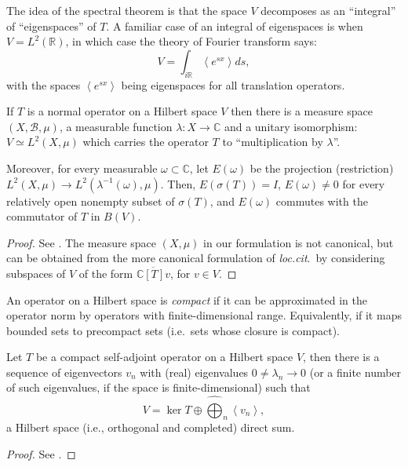 The idea of the spectral theorem is that the space $V$ decomposes as an ``integral'' of ``eigenspaces'' of $T$. A familiar case of an integral of eigenspaces is when $V=L^2(\mathbb R)$, in which case the theory of Fourier transform says:
$$V= \int_{i\mathbb R} \left< e^{sx}\right> ds,$$
with the spaces $\left< e^{sx}\right>$ being eigenspaces for all translation operators. 

\begin{theorem}
\label{theorem-spectraltheorem-normal}
 If $T$ is a normal operator on a Hilbert space $V$ then there is a measure space $(X,\mathcal B,\mu)$, a measurable function $\lambda: X\to \mathbb C$ and a unitary isomorphism: $V \simeq L^2(X,\mu)$ which carries the operator $T$ to ``multiplication by $\lambda$''.
 
 Moreover, for every measurable $\omega\subset \mathbb C$, let $E(\omega)$ be the projection (restriction) $L^2(X,\mu) \to L^2(\lambda^{-1}(\omega),\mu)$. Then, $E(\sigma(T))=I$, $E(\omega)\ne 0$ for every relatively open nonempty subset of $\sigma(T)$, and $E(\omega)$ commutes with the commutator of $T$ in $B(V)$.
\end{theorem}

\begin{proof}
 See \cite[Theorem 12.23]{Rudin}. The measure space $(X,\mu)$ in our formulation is not canonical, but can be obtained from the more canonical formulation of \emph{loc.cit}.\ by considering subspaces of $V$ of the form $\overline{\mathbb C[T]v}$, for $v\in V$. 
\end{proof}



An operator on a Hilbert space is \emph{compact} if it can be approximated in the operator norm by operators with finite-dimensional range. Equivalently, if it maps bounded sets to precompact sets (i.e.\ sets whose closure is compact). 

\begin{theorem}
\label{theorem-spectraltheorem-compact} 
 Let $T$ be a compact self-adjoint operator on a Hilbert space $V$, then there is a sequence of eigenvectors $v_n$ with (real) eigenvalues $0\ne\lambda_n\to 0$ (or a finite number of such eigenvalues, if the space is finite-dimensional) such that 
 $$V = \ker T \oplus \hat{\bigoplus}_n \left< v_n\right>,$$
a Hilbert space (i.e., orthogonal and completed) direct sum. 
\end{theorem}

\begin{proof}
 See \cite[Theorem 12.30]{Rudin}.
\end{proof}


